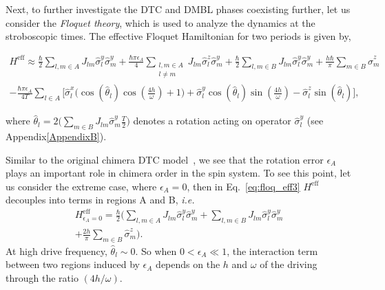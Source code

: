 \documentclass[%
reprint,
superscriptaddress,
amsmath,amssymb,showkeys,
aps,
prb,
]{revtex4-2}
\begin{document}
	Next, to further investigate the DTC and DMBL phases coexisting further, let us consider the \textit{Floquet theory}, which is used to analyze the dynamics at the stroboscopic times. The effective Floquet Hamiltonian for two periods is given by,
	\begin{widetext}
		\begin{multline}
			H^{\mathrm{eff}} \approx\frac{\hbar}{2} \sum_{l,m\in A}J_{lm}\hat{\sigma}_l^y\hat{\sigma}_m^y +\frac{\hbar \pi \epsilon_A}{4} \sum_{\substack{l,m\in A\\l\neq m}} J_{lm}\hat{\sigma}^z_l\hat{\sigma}^y_m + \frac{\hbar}{2}\sum_{l,m\in B}J_{lm}\hat{\sigma}_l^y \hat{\sigma}_m^y + \frac{h\hbar}{\pi}\sum_{m \in B}\hat{\sigma}^z_m \\ -\frac{\hbar \pi \epsilon_A}{4T}\sum_{l\in A}\Bigg[\hat{\sigma}^x_l \Bigg(\cos(\hat{\theta}_l)\cos(\frac{4h}{\omega})+1 \Bigg) + \hat{\sigma}^y_l \cos(\hat{\theta}_l)\sin(\frac{4h}{\omega})-\hat{\sigma}^z_l \sin(\hat{\theta}_l)\Bigg],
			\label{eq:floq_eff3}
		\end{multline}
	\end{widetext}
	where $\displaystyle \hat{\theta}_l = 2 \Big(\sum_{m \in B}J_{lm}\hat{\sigma}^y_m \frac{T}{2} \Big)$ denotes a rotation acting on operator $\hat{\sigma}^y_l$ (see Appendix\ref{AppendixB}).
	
	Similar to the original chimera DTC model~\cite{sakurai_phys_nodate}, we see that the rotation error $\epsilon_A$ plays an important role in chimera order in the spin system. To see this point, let us consider the extreme case, where $\epsilon_A=0$, then in Eq.~\eqref{eq:floq_eff3}  $H^\mathrm{eff}$ decouples into terms in regions A and B, \textit{i.e.}
	\begin{multline}
		H^{\mathrm{eff}}_{\epsilon_A=0} =  \frac{\hbar}{2}\Bigg( \sum_{l,m\in A} J_{lm} \hat{\sigma}^y_l\hat{\sigma}^y_m +\sum_{l,m\in B} J_{lm} \hat{\sigma}^y_l\hat{\sigma}^y_m\\+\frac{2h }{\pi}\sum_{m \in B}\hat{\sigma}^z_m\Bigg).
	\end{multline}
	At high drive  frequency, $\hat{\theta}_l \sim 0$. So when $0<\epsilon_A \ll 1$, the interaction term between two regions induced by $\epsilon_A$ depends on the $h$ and $\omega$ of the driving through the ratio $(4h/\omega)$. 
	
\end{document}
